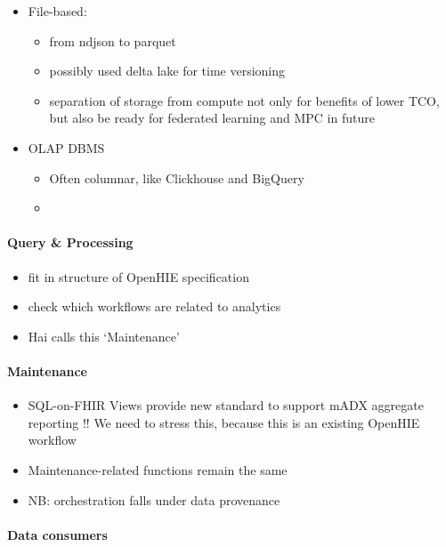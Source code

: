 \documentclass[
  authoryear]{elsarticle}
\let\oldparagraph\paragraph
\renewcommand{\paragraph}[1]{\oldparagraph{#1}\mbox{}}
\providecommand{\tightlist}{%
  \setlength{\itemsep}{0pt}\setlength{\parskip}{0pt}}\usepackage{longtable,booktabs,array}
\begin{document}
\begin{itemize}
\tightlist
\item
  File-based:

  \begin{itemize}
  \tightlist
  \item
    from ndjson to parquet
  \item
    possibly used delta lake for time versioning
  \item
    separation of storage from compute not only for benefits of lower
    TCO, but also be ready for federated learning and MPC in future
  \end{itemize}
\item
  OLAP DBMS

  \begin{itemize}
  \tightlist
  \item
    Often columnar, like Clickhouse and BigQuery
  \item
  \end{itemize}
\end{itemize}

\paragraph{Query \& Processing}\label{query-processing}

\begin{itemize}
\tightlist
\item
  fit in structure of OpenHIE specification
\item
  check which workflows are related to analytics
\item
  Hai calls this `Maintenance'
\end{itemize}

\paragraph{Maintenance}\label{maintenance}

\begin{itemize}
\tightlist
\item
  SQL-on-FHIR Views provide new standard to support mADX aggregate
  reporting !! We need to stress this, because this is an existing
  OpenHIE workflow
\item
  Maintenance-related functions remain the same
\item
  NB: orchestration falls under data provenance
\end{itemize}

\paragraph{Data consumers}\label{data-consumers}
\end{document}
